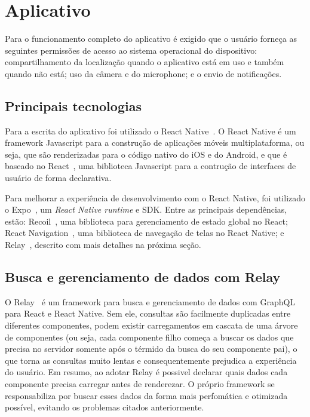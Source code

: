 \FloatBarrier

\section{Aplicativo}

Para o funcionamento completo do aplicativo é exigido que o usuário forneça as seguintes permissões de acesso ao sistema operacional do dispositivo: compartilhamento da localização quando o aplicativo está em uso e também quando não está; uso da câmera e do microphone; e o envio de notificações. 

\subsection{Principais tecnologias}

Para a escrita do aplicativo foi utilizado o React Native~\cite{react-native}. O React Native é um framework Javascript para a construção de aplicações móveis multiplataforma, ou seja, que são renderizadas para o código nativo do iOS e do Android, e que é baseado no React~\cite{react}, uma biblioteca Javascript para a contrução de interfaces de usuário de forma declarativa.

Para melhorar a experiência de desenvolvimento com o React Native, foi utilizado o Expo~\cite{expo}, um \emph{React Native runtime} e SDK. Entre as principais dependências, estão: Recoil~\cite{recoil}, uma biblioteca para gerenciamento de estado global no React; React Navigation~\cite{react-navigation}, uma biblioteca de navegação de telas no React Native; e Relay~\cite{relay}, descrito com mais detalhes na próxima seção.

\subsection{Busca e gerenciamento de dados com Relay}

O Relay~\cite{relay} é um framework para busca e gerenciamento de dados com GraphQL para React e React Native. Sem ele, consultas são facilmente duplicadas entre diferentes componentes, podem existir carregamentos em cascata de uma árvore de componentes (ou seja, cada componente filho começa a buscar os dados que precisa no servidor somente após o térmido da busca do seu componente pai), o que torna as consultas muito lentas e consequentemente prejudica a experiência do usuário. Em resumo, ao adotar Relay é possivel declarar quais dados cada componente precisa carregar antes de renderezar. O próprio framework se responsabiliza por buscar esses dados da forma mais perfomática e otimizada possível, evitando os problemas citados anteriormente.

